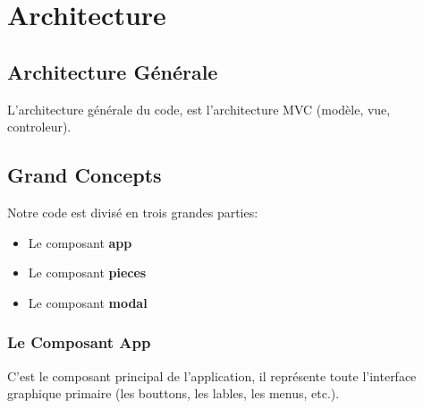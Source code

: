 \section{Architecture}\label{architecture}

\subsection[short]{Architecture Générale}

L'architecture générale du code, est l'architecture MVC (modèle, vue, controleur).

\subsection[short]{Grand Concepts}

Notre code est divisé en trois grandes parties:
\begin{itemize}
    \item Le composant \textbf{app}
    \item Le composant \textbf{pieces}
    \item Le composant \textbf{modal}
\end{itemize}

\subsubsection[short]{Le Composant App}

C'est le composant principal de l'application, il représente toute l'interface graphique 
primaire (les bouttons, les lables, les menus, etc.).